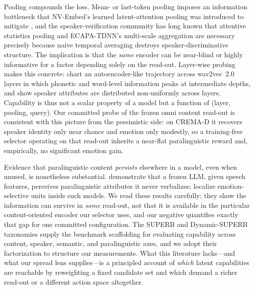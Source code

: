 Pooling compounds the loss. Mean- or last-token pooling imposes an information bottleneck that NV-Embed's learned latent-attention pooling was introduced to mitigate \citep{nvembed2024}, and the speaker-verification community has long known that attentive statistics pooling \citep{attnstatspool2018} and ECAPA-TDNN's multi-scale aggregation \citep{ecapatdnn2020} are necessary precisely because naive temporal averaging destroys speaker-discriminative structure. The implication is that the \emph{same} encoder can be near-blind or highly informative for a factor depending solely on the read-out. Layer-wise probing makes this concrete: \citet{pasad2021layerwise} chart an autoencoder-like trajectory across wav2vec~2.0 layers in which phonetic and word-level information peaks at intermediate depths, and \citet{spkattrprobing2025} show speaker attributes are distributed non-uniformly across layers. Capability is thus not a scalar property of a model but a function of (layer, pooling, query). Our committed probe of the frozen omni content read-out is consistent with this picture from the pessimistic side: on CREMA-D it recovers speaker identity only near chance and emotion only modestly, so a training-free selector operating on that read-out inherits a near-flat paralinguistic reward and, empirically, no significant emotion gain.

Evidence that paralinguistic content \emph{persists} elsewhere in a model, even when unused, is nonetheless substantial. \citet{frozenllmparaling2024} demonstrate that a frozen LLM, given speech features, perceives paralinguistic attributes it never verbalizes; \citet{emotionneurons2026} localize emotion-selective units inside such models. We read these results carefully: they show the information can survive in \emph{some} read-out, not that it is available in the particular content-oriented encoder our selector uses, and our negative quantifies exactly that gap for one committed configuration. The SUPERB and Dynamic-SUPERB taxonomies \citep{superb2021,dynsuperb2023} supply the benchmark scaffolding for evaluating capability across content, speaker, semantic, and paralinguistic axes, and we adopt their factorization to structure our measurements. What this literature lacks---and what our spread lens supplies---is a principled account of \emph{which} latent capabilities are reachable by reweighting a fixed candidate set and which demand a richer read-out or a different action space altogether.